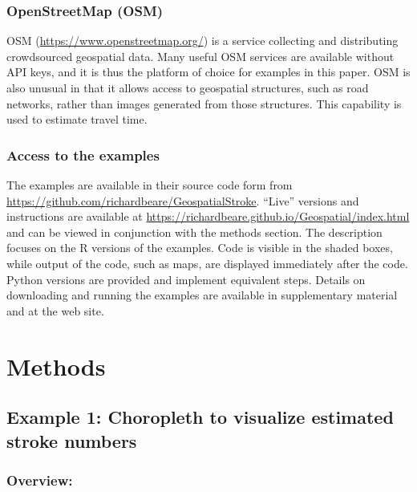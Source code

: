 \documentclass[utf8]{frontiersHLTH}
\begin{document}
\subsubsection{OpenStreetMap (OSM)}\label{openstreetmap-osm}

OSM (\url{https://www.openstreetmap.org/}) is a service collecting and
distributing crowdsourced geospatial data. Many useful OSM services are
available without API keys, and it is thus the platform of choice for
examples in this paper. OSM is also unusual in that it allows access to
geospatial structures, such as road networks, rather than images
generated from those structures. This capability is used to estimate
travel time.

\subsubsection{Access to the examples}\label{access-to-the-examples}

The examples are available in their source code form from
\href{https://github.com/richardbeare/GeospatialStroke}{https://github.com/richardbeare/GeospatialStroke}.
``Live'' versions and instructions are available at
\href{https://richardbeare.github.io/Geospatial/index.html}{https://richardbeare.github.io/Geospatial/index.html}
and can be viewed in conjunction with the methods section. The
description focuses on the R versions of the examples. Code is visible
in the shaded boxes, while output of the code, such as maps, are
displayed immediately after the code. Python versions are provided and
implement equivalent steps.  Details on downloading and running the
examples are available in supplementary material and at the web site.

\section{Methods}\label{methods}

\subsection{Example 1: Choropleth to visualize estimated stroke
numbers}\label{example-1-choropleth-to-visualize-estimated-stroke-numbers}

\subsubsection{Overview:}\label{overview}
\end{document}
